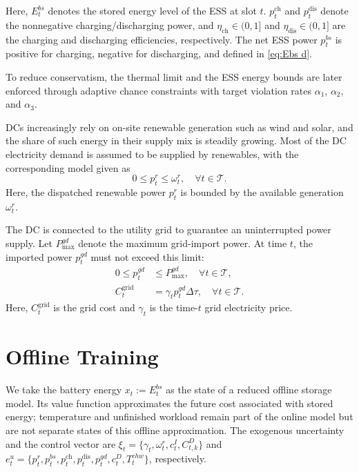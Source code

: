\documentclass[a4paper,fleqn]{cas-dc}
\theoremstyle{plain}
\theoremstyle{remark}
\theoremstyle{plain}
\begin{document}
Here, $E_t^{bs}$ denotes the stored energy level of the ESS at slot $t$.
$p_t^{\text{ch}}$ and $p_t^{\text{dis}}$ denote the nonnegative charging/discharging power,
and $\eta_{\text{ch}}\in(0,1]$ and $\eta_{\text{dis}}\in(0,1]$ are the charging and discharging efficiencies, respectively.
The net ESS power $p_t^{bs}$ is positive for charging, negative for discharging, and defined in \eqref{eq:Ebs d}.

To reduce conservatism, the thermal limit and the ESS energy bounds are later enforced through adaptive chance constraints with target violation rates $\alpha_1$, $\alpha_2$, and $\alpha_3$.

DCs increasingly rely on on-site renewable generation such as wind and solar, and the share of such energy in their supply mix is steadily growing. Most of the DC electricity demand is assumed to be supplied by renewables, with the corresponding model given as
\begin{equation}\label{eq:renewable}
    0 \leq p_t^r \leq \omega_t^r, \quad \forall t \in \mathcal{T}.
\end{equation}
Here, the dispatched renewable power $p_t^r$ is bounded by the available generation $\omega_t^r$.

The DC is connected to the utility grid to guarantee an uninterrupted power supply. Let $P_{\max}^{gd}$ denote the maximum grid-import power. At time $t$, the imported power $p_t^{gd}$ must not exceed this limit:
\begin{equation}\label{eq:pgd}
\begin{aligned}
0 \leq p_t^{gd} &\leq P_{\max}^{gd}, \quad \forall t \in \mathcal{T}, \\
C_t^{\text{grid}}&=\gamma_t p_t^{gd}\Delta \tau , \quad \forall t \in \mathcal{T}.
\end{aligned}
\end{equation}
Here, $C_t^{\text{grid}}$ is the grid cost and $\gamma_t$ is the time-$t$ grid electricity price.

\section{Offline Training}\label{sec:offline_training}
We take the battery energy $x_t:=E_t^{bs}$ as the state of a reduced offline storage model. Its value function approximates the future cost associated with stored energy; temperature and unfinished workload remain part of the online model but are not separate states of this offline approximation. The exogenous uncertainty and the control vector are $\xi_t=\{\gamma_t,\omega_t^r,c_t^I,C_{t,k}^D\}$ and $e_t^u=\{p_t^r,p_t^{bs},p_t^{\text{ch}},p_t^{\text{dis}},p_t^{gd},c_t^D,T_t^{chw}\}$, respectively.
\end{document}
